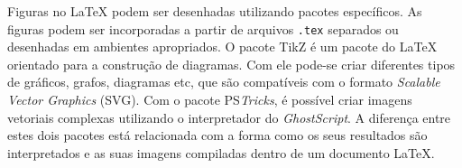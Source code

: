 
Figuras no \LaTeX{} podem ser desenhadas utilizando pacotes específicos. As figuras podem ser incorporadas a partir de arquivos {\tt .tex} separados ou desenhadas em ambientes apropriados. O pacote TikZ é um pacote do \LaTeX{} orientado para a construção de diagramas. Com ele pode-se criar diferentes tipos de gráficos, grafos, diagramas etc, que são compatíveis com o formato \textit{Scalable Vector Graphics} (SVG). Com o pacote PS\textit{Tricks}, é possível criar imagens vetoriais complexas utilizando o interpretador do \textit{GhostScript}. A diferença entre estes dois pacotes está relacionada com a forma como os seus resultados são interpretados e as suas imagens compiladas dentro de um documento \LaTeX{}. %

%
%

